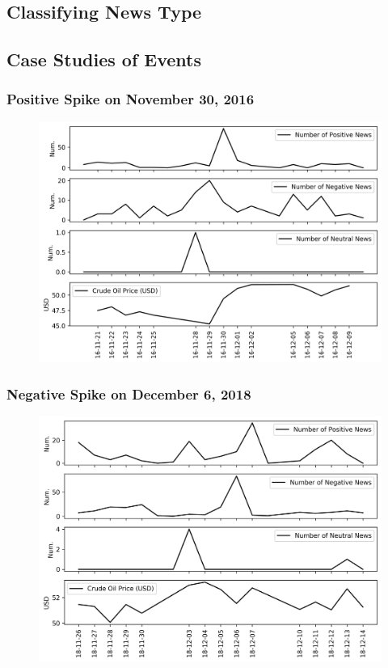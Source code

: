 \documentclass[12pt]{article}
\begin{document}
	\subsection{Classifying News Type}
	
	\subsection{Case Studies of Events}
	\subsubsection{Positive Spike on November 30, 2016}
	\begin{figure}[H]
		\centering
		\small
		\includegraphics[width=\linewidth]{figures/case_studies/20161130_10d.png}
		\caption{}
	\end{figure}
	
	\subsubsection{Negative Spike on December 6, 2018}
	\begin{figure}[H]
		\centering
		\small
		\includegraphics[width=\linewidth]{figures/case_studies/20181206_10d.png}
		\caption{}
	\end{figure}
	
\end{document}
